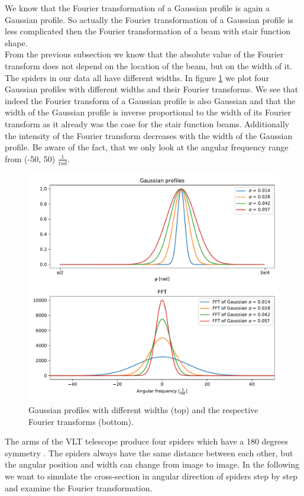 We know that the Fourier transformation of a Gaussian profile is again a Gaussian profile. So actually the Fourier transformation of a Gaussian profile is less complicated then the Fourier transformation of a beam with stair function shape.\\ 
From the previous subsection we know that the absolute value of the Fourier transform does not depend on the location of the beam, but on the width of it. The spiders in our data all have different widths. In figure \ref{fig:Gauss_diffwidths} we plot four Gaussian profiles with different widths and their Fourier transforms. We see that indeed the Fourier transform of a Gaussian profile is also Gaussian and that the width of the Gaussian profile is inverse proportional to the width of its Fourier transform as it already was the case for the stair function beams. Additionally the intensity of the Fourier transform decreases with the width of the Gaussian profile. Be aware of the fact, that we only look at the angular frequency range from (-50, 50) $\frac{1}{\mathrm{rad}}$.
\begin{figure}[H]
	\centering
		\includegraphics[width=1.0\textwidth]{pics/Gauss_diffwidths.pdf}
		\caption{Gaussian profiles with different widths (top) and the respective Fourier transforms (bottom).}
		\label{fig:Gauss_diffwidths}
\end{figure} 
The arms of the VLT telescope produce four spiders which have a 180 degrees symmetry \cite{ESOmanual}. The spiders always have the same distance between each other, but the angular position and width can change from image to image. In the following we want to simulate the cross-section in angular direction of spiders step by step and examine the Fourier transformation.\\ 
